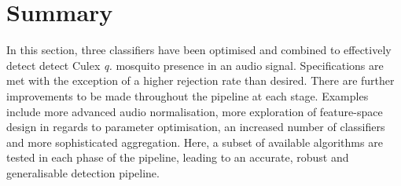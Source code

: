 \section{Summary}
\label{sec:exp-summary}
    In this section, three classifiers have been optimised and combined to effectively detect detect Culex \textit{q.} mosquito presence in an audio signal. Specifications are met with the exception of a higher rejection rate than desired. There are further improvements to be made throughout the pipeline at each stage. Examples include more advanced audio normalisation, more exploration of feature-space design in regards to parameter optimisation, an increased number of classifiers and more sophisticated aggregation. Here, a subset of available algorithms are tested in each phase of the pipeline, leading to an accurate, robust and generalisable detection pipeline.